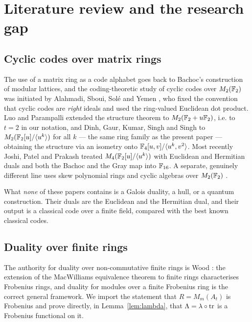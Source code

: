 \section{Literature review and the research gap}
\label{sec:lit}

\subsection{Cyclic codes over matrix rings}

The use of a matrix ring as a code alphabet goes back to
Bachoc's construction of modular lattices, and the coding-theoretic study of
cyclic codes over $M_2(\mathbb F_2)$ was initiated by Alahmadi, Sboui, Sol\'e and
Yemen \cite{Alahmadi2013CyclicM2F2}, who fixed the convention that cyclic codes
are \emph{right} ideals and used the ring-valued Euclidean dot product. Luo and
Parampalli \cite{LuoParampalli2018M2F2uF2} extended the structure theorem to
$M_2(\mathbb F_2+u\mathbb F_2)$, i.e. to $t=2$ in our notation, and Dinh, Gaur, Kumar, Singh
and Singh \cite{Dinh2024CyclicRingsOfMatrices} to $M_2(\mathbb F_2[u]/\langle u^k\rangle)$
for all $k$ --- the same ring family as the present paper --- obtaining the
structure via an isometry onto $\mathbb F_4[u,v]/\langle u^k,v^2\rangle$. Most
recently Joshi, Patel and Prakash \cite{JoshiPatelPrakash2026M4} treated
$M_4(\mathbb F_2[u]/\langle u^k\rangle)$ with Euclidean and Hermitian duals and both
the Bachoc and the Gray map into $\mathbb F_{16}$. A separate, genuinely different line
uses skew polynomial rings and cyclic algebras over $M_2(\mathbb F_2)$
\cite{SiNiu2023SkewM2F2}.

What \emph{none} of these papers contains is a Galois duality, a hull, or a
quantum construction. Their duals are the Euclidean and the Hermitian dual, and
their output is a classical code over a finite field, compared with the best
known classical codes.

\subsection{Duality over finite rings}

The authority for duality over non-commutative finite rings is Wood
\cite{Wood1999Duality}: the extension of the MacWilliams equivalence theorem to
finite rings characterises Frobenius rings, and duality for modules over a
finite Frobenius ring is the correct general framework. We import the statement
that $R=M_m(A_t)$ is Frobenius and prove directly, in
Lemma~\ref{lem:lambda}, that $\Lambda=\lambda\circ\operatorname{tr}$ is a Frobenius functional
on it.

